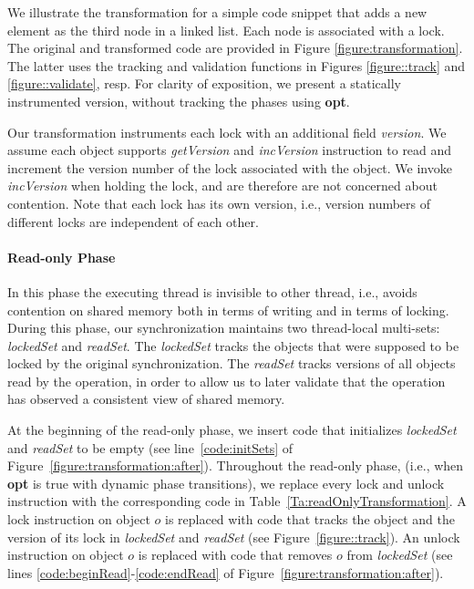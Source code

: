 We illustrate the transformation for a simple code snippet that adds a new element as the third node in a linked list. Each node is associated with a  lock.
The original and transformed code are provided in Figure \ref{figure:transformation}. The latter uses
the tracking and validation functions in Figures \ref{figure::track} and
\ref{figure::validate}, resp.
For clarity of exposition, we present a statically instrumented version, without tracking the phases using \textbf{opt}.


Our transformation instruments each lock with an additional field \emph{version}. We assume each object supports \emph{getVersion} and \emph{incVersion} instruction to read and increment the version number of the lock associated with the object. We invoke \emph{incVersion} when holding the lock, and are therefore are not concerned about contention.
Note that each lock has its own version, i.e., version numbers of different locks are independent of each other.

\paragraph{Read-only Phase}
In this phase the executing thread is invisible to other thread, i.e., 
 avoids  contention on shared memory both in terms of writing and in terms of locking.
During this phase, our synchronization maintains two thread-local multi-sets: \emph{lockedSet} and \emph{readSet}.
The \emph{lockedSet} tracks the objects that were supposed to be locked by the original synchronization.
%
The \emph{readSet} tracks versions of all objects read by the
operation, in order to allow us to later validate that the operation has observed a consistent view of shared memory.

At the beginning of the read-only phase, we insert code that initializes \emph{lockedSet} and \emph{readSet} to be empty (see  line~\ref{code:initSets} of Figure~\ref{figure:transformation:after}).
Throughout the read-only phase, (i.e., when \textbf{opt} is true with dynamic phase transitions), 
we replace every lock and unlock instruction with the corresponding code in Table~\ref{Ta:readOnlyTransformation}.
A lock instruction on object $o$ is replaced with code that tracks the object and the version of its lock in
 \emph{lockedSet} and \emph{readSet} (see Figure~\ref{figure::track}).
An unlock instruction on object $o$ is replaced with code that removes $o$ from \emph{lockedSet} (see
lines \ref{code:beginRead}-\ref{code:endRead} of Figure~\ref{figure:transformation:after}).

